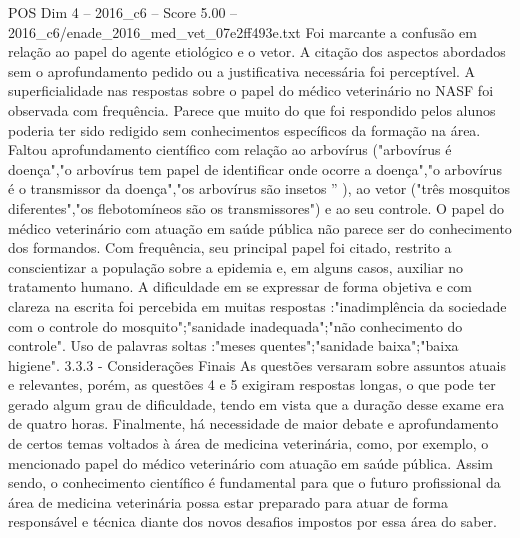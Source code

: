 \begin{textsample}{POS Dim 4 – 2016\_c6 – Score 5.00 – 2016\_c6/enade\_2016\_med\_vet\_07e2ff493e.txt}
Foi marcante a confusão em relação ao papel do agente etiológico e o vetor.
A citação dos aspectos abordados sem o aprofundamento pedido ou a justificativa necessária foi perceptível.
A superficialidade nas respostas sobre o papel do médico veterinário no NASF foi observada com frequência.
Parece que muito do que foi respondido pelos alunos poderia ter sido redigido sem conhecimentos específicos da formação na área.
Faltou aprofundamento científico com relação ao arbovírus ("arbovírus é doença","o arbovírus tem papel de identificar onde ocorre a doença","o arbovírus é o transmissor da doença","os arbovírus são insetos ” ), ao vetor ("três mosquitos diferentes","os flebotomíneos são os transmissores") e ao seu controle.
O papel do médico veterinário com atuação em saúde pública não parece ser do conhecimento dos formandos.
Com frequência, seu principal papel foi citado, restrito a conscientizar a população sobre a epidemia e, em alguns casos, auxiliar no tratamento humano.
A dificuldade em se expressar de forma objetiva e com clareza na escrita foi percebida em muitas respostas :"inadimplência da sociedade com o controle do mosquito";"sanidade inadequada";"não conhecimento do controle".
Uso de palavras soltas :"meses quentes";"sanidade baixa";"baixa higiene". 3.3.3 - Considerações Finais As questões versaram sobre assuntos atuais e relevantes, porém, as questões 4 e 5 exigiram respostas longas, o que pode ter gerado algum grau de dificuldade, tendo em vista que a duração desse exame era de quatro horas.
Finalmente, há necessidade de maior debate e aprofundamento de certos temas voltados à área de medicina veterinária, como, por exemplo, o mencionado papel do médico veterinário com atuação em saúde pública.
Assim sendo, o conhecimento científico é fundamental para que o futuro profissional da área de medicina veterinária possa estar preparado para atuar de forma responsável e técnica diante dos novos desafios impostos por essa área do saber.

\end{textsample}
